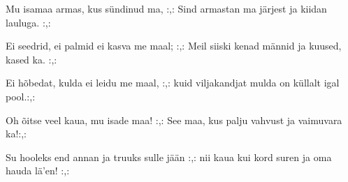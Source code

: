 Mu isamaa armas, kus s\"undinud ma,
:,: Sind armastan ma j\"arjest ja kiidan lauluga. :,: 

Ei seedrid, ei palmid ei kasva me maal;
:,: Meil siiski kenad m\"annid ja kuused, kased ka. :,: 

Ei h\~obedat, kulda ei leidu me maal,
:,: kuid viljakandjat mulda on k\"ullalt igal pool.:,: 

Oh \~oitse veel kaua, mu isade maa!
:,: See maa, kus palju vahvust ja vaimuvara ka!:,: 

Su hooleks end annan ja truuks sulle j\"a\"an
:,: nii kaua kui kord suren ja oma hauda l\"a'en! :,: 